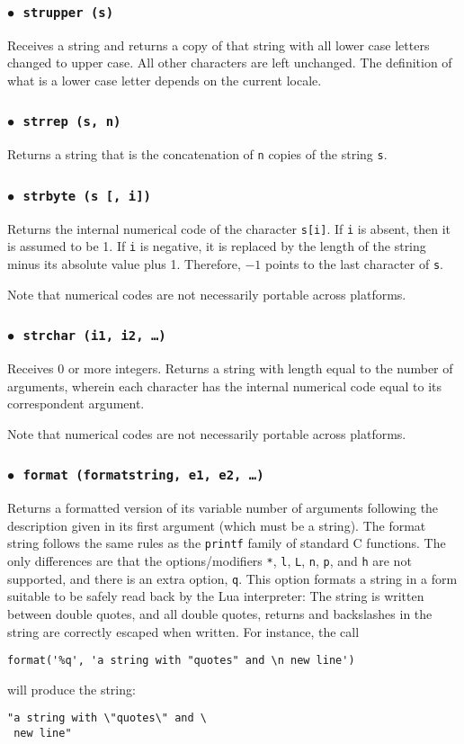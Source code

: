 \documentclass[11pt]{article}
\newcommand{\T}[1]{{\tt #1}}
\newcommand{\Math}[1]{$#1$}
\newcommand{\Deffunc}[1]{\index{#1}}
\newcommand{\ff}{$\bullet$\ }
\begin{document}
\subsubsection*{\ff \T{strupper (s)}}\Deffunc{strupper}
Receives a string and returns a copy of that string with all
lower case letters changed to upper case.
All other characters are left unchanged.
The definition of what is a lower case
letter depends on the current locale.

\subsubsection*{\ff \T{strrep (s, n)}}\Deffunc{strrep}
Returns a string that is the concatenation of \verb|n| copies of
the string \verb|s|.

\subsubsection*{\ff \T{strbyte (s [, i])}}\Deffunc{strbyte}
Returns the internal numerical code of the character \verb|s[i]|.
If \verb|i| is absent, then it is assumed to be 1.
If \verb|i| is negative,
it is replaced by the length of the string minus its
absolute value plus 1.
Therefore, \Math{-1} points to the last character of \verb|s|.

Note that numerical codes are not necessarily portable across platforms.

\subsubsection*{\ff \T{strchar (i1, i2, \ldots)}}\Deffunc{strchar}
Receives 0 or more integers.
Returns a string with length equal to the number of arguments,
wherein each character has the internal numerical code equal
to its correspondent argument.

Note that numerical codes are not necessarily portable across platforms.

\subsubsection*{\ff \T{format (formatstring, e1, e2, \ldots)}}\Deffunc{format}
\label{format}
Returns a formatted version of its variable number of arguments
following the description given in its first argument (which must be a string).
The format string follows the same rules as the \verb|printf| family of
standard C functions.
The only differences are that the options/modifiers
\verb|*|, \verb|l|, \verb|L|, \verb|n|, \verb|p|,
and \verb|h| are not supported,
and there is an extra option, \verb|q|.
This option formats a string in a form suitable to be safely read
back by the Lua interpreter:
The string is written between double quotes,
and all double quotes, returns and backslashes in the string
are correctly escaped when written.
For instance, the call
\begin{verbatim}
format('%q', 'a string with "quotes" and \n new line')
\end{verbatim}
will produce the string:
\begin{verbatim}
"a string with \"quotes\" and \
 new line"
\end{verbatim}
\end{document}
